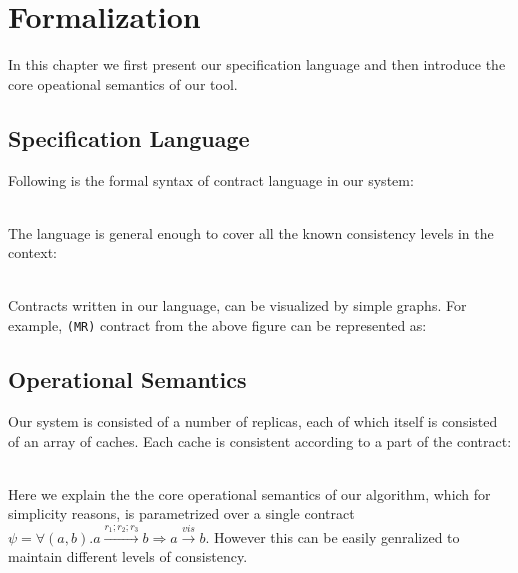 \section{Formalization}
In this chapter we first present our specification language and then
introduce the core opeational semantics of our tool.
\subsection{Specification Language}
Following is the formal syntax of contract language in our system:

\\ The language is general enough to cover all  the known consistency
levels in the context:

\\ Contracts written in our language, can be visualized by simple graphs. For example, \texttt{(MR)} contract from the above figure can be represented as:



\newpage
\subsection{Operational Semantics}
Our system is consisted of a number of replicas, each of which itself is consisted of an array of caches. Each cache is consistent according to a part of the contract:

\\ Here we explain the the core operational semantics of our algorithm, which for simplicity reasons, 
is parametrized over a single contract 
$\psi = \forall (a,b). a \xrightarrow{r_1;r_2;r_3} b  \Rightarrow a \xrightarrow{vis} b$. 
However this can be easily  genralized to maintain different levels of consistency. 

